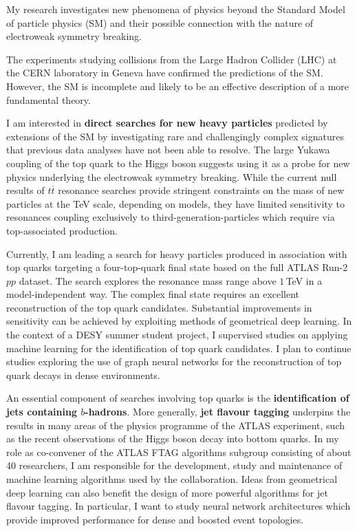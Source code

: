 \documentclass{article}
\begin{document}
\raisebox{.5cm}

My research investigates new phenomena of physics beyond the Standard Model of particle physics (SM) and their possible connection with the nature of electroweak symmetry breaking.

The experiments studying collisions from the Large Hadron Collider (LHC) at the CERN laboratory in Geneva have confirmed the predictions of the SM. However, the SM is incomplete and likely to be an effective description of a more fundamental theory.
\bigskip

I am interested in \textbf{direct searches for new heavy particles} predicted by extensions of the SM by investigating rare and challengingly complex signatures that previous data analyses have not been able to resolve.
The large Yukawa coupling of the top quark to the Higgs boson suggests using it as a probe for new physics underlying the electroweak symmetry breaking.
While the current null results of \(t\overline{t}\) resonance searches provide stringent constraints on the mass of new particles at the TeV scale, depending on models, they have limited sensitivity to resonances coupling exclusively to third-generation-particles which require via top-associated production.

Currently, I am leading a search for heavy particles produced in association with top quarks targeting a four-top-quark final state based on the full ATLAS Run-2 \(pp\) dataset. The search explores the resonance mass range above \(1\,\)TeV in a model-independent way.
The complex final state requires an excellent reconstruction of the top quark candidates.
Substantial improvements in sensitivity can be achieved by exploiting methods of geometrical deep learning.
In the context of a DESY summer student project, I supervised studies on applying machine learning for the identification of top quark candidates. I plan to continue studies exploring the use of graph neural networks for the reconstruction of top quark decays in dense environments.

\medskip

An essential component of searches involving top quarks is the \textbf{identification of jets containing \(b\)-hadrons}. More generally, \textbf{jet flavour tagging} underpins the results in many areas of the physics programme of the ATLAS experiment, such as the recent observations of the Higgs boson decay into bottom quarks.
In my role as co-convener of the ATLAS FTAG algorithms subgroup consisting of about 40 researchers, I am responsible for the development, study and maintenance of machine learning algorithms used by the collaboration.
Ideas from geometrical deep learning can also benefit the design of more powerful algorithms for jet flavour tagging. In particular, I want to study neural network architectures which provide improved performance for dense and boosted event topologies.
\end{document}
